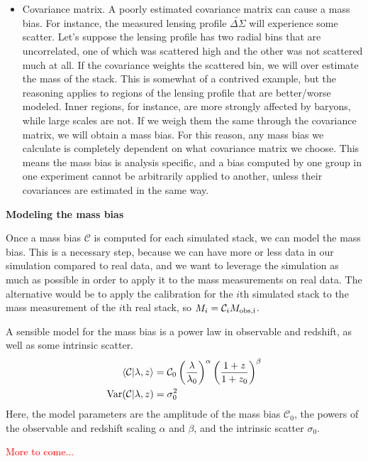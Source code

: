 \documentclass[12pt]{article}
\newcommand{\red}[1]{\textcolor{red}{#1}}
\newcommand{\wds}{\widetilde{\Delta\Sigma}}
\begin{document}
\begin{itemize}
\item Covariance matrix. A poorly estimated covariance matrix can cause a mass bias. For instance, the measured lensing profile $\wds$ will experience some scatter. Let's suppose the lensing profile has two radial bins that are uncorrelated, one of which was scattered high and the other was not scattered much at all. If the covariance weights the scattered bin, we will over estimate the mass of the stack. This is somewhat of a contrived example, but the reasoning applies to regions of the lensing profile that are better/worse modeled. Inner regions, for instance, are more strongly affected by baryons, while large scales are not. If we weigh them the same through the covariance matrix, we will obtain a mass bias. For this reason, any mass bias we calculate is completely dependent on what covariance matrix we choose. This means the mass bias is analysis specific, and a bias computed by one group in one experiment cannot be arbitrarily applied to another, unless their covariances are estimated in the same way.
\end{itemize}
%

\vspace{12pt}
\noindent
{\bf Modeling the mass bias}

Once a mass bias $\mathcal{C}$ is computed for each simulated stack, we can model the mass bias. This is a necessary step, because we can have more or less data in our simulation compared to real data, and we want to leverage the simulation as much as possible in order to apply it to the mass measurements on real data. The alternative would be to apply the calibration for the $i$th simulated stack to the mass measurement of the $i$th real stack, so $M_{i} = \mathcal{C}_i M_{\rm obs,i}$.

A sensible model for the mass bias is a power law in observable and redshift, as well as some intrinsic scatter.
%
\begin{align}
	\label{eq:mass_bias_form}
	\langle \mathcal{C}|\lambda,z\rangle  & = \mathcal{C}_0\left(\frac{\lambda}{\lambda_0} \right)^\alpha \left(\frac{1+z}{1+z_0}\right)^\beta \\
	{\rm Var}(\mathcal{C}|\lambda,z) & = \sigma_0^2
\end{align}
%
Here, the model parameters are the amplitude of the mass bias $\mathcal{C}_0$, the powers of the observable and redshift scaling $\alpha$ and $\beta$, and the intrinsic scatter $\sigma_0$.

\noindent
\red{More to come...}
\end{document}
